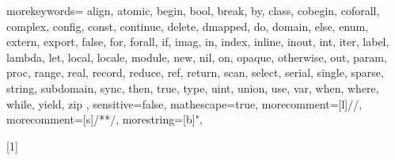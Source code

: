   {
    morekeywords={
      align, atomic,
      begin, bool, break, by,
      class, cobegin, coforall, complex, config, const, continue,
      delete, dmapped, do, domain,
      else, enum, extern, export,
      false, for, forall,
      if, imag, in, index, inline, inout, int, iter,
      label, lambda, let, local, locale,
      module,
      new, nil,
      on, opaque, otherwise, out,
      param, proc,
      range, real, record, reduce, ref, return,
      scan, select, serial, single, sparse, string, subdomain, sync,
      then, true, type,
      uint, union, use,
      var,
      when, where, while,
      yield,
      zip
    },
    sensitive=false,
    mathescape=true,
    morecomment=[l]{//},
    morecomment=[s]{/*}{*/},
    morestring=[b]",
}


\newcommand{\chpl}[1]{\lstinline[language=chapel,basicstyle=\small\ttfamily,keywordstyle=]!#1!}
\newcommand{\varname}[1]{\emph{#1}}
\newcommand{\typename}[1]{\emph{#1}}
\newcommand{\fnname}[1]{\chpl{#1}}




[1]
  {\lstset{language=chapel,xleftmargin=2pc,stepnumber=0,keywordstyle=}}{}



\newenvironment{protobody}{\begin{description}\item[\quad\quad] }{\end{description}}
